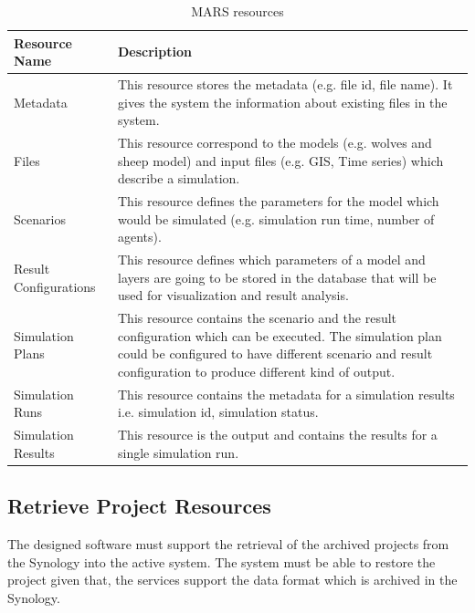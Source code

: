         \begin{table}[H]
            \centering
            \begin{tabular}{|p{3cm}|p{12cm}|}
                \hline
                    \textbf{Resource Name}  & \textbf{Description}\\
                \hline
                     Metadata & 
                     This resource stores the metadata (e.g. file id, file name). It gives the system the information about
                     existing files in the system. \\
                \hline
                     Files & 
                     This resource correspond to the models (e.g. wolves and sheep model) and input files (e.g. GIS, Time series) which describe a simulation. \\
                \hline
                     Scenarios & 
                     This resource defines the parameters for the model which would be simulated (e.g. simulation run time, number of agents). \\
                \hline
                     Result Configurations & 
                     This resource defines which parameters of a model and layers are going to be stored in the database that will be used for visualization
                     and result analysis.\\
                \hline
                     Simulation Plans & 
                     This resource contains the scenario and the result configuration which can be executed. The simulation plan could be configured to
                     have different scenario and result configuration to produce different kind of output.\\
                \hline
                     Simulation Runs & 
                     This resource contains the metadata for a simulation results i.e. simulation id, simulation status.\\
                \hline
                     Simulation Results & 
                     This resource is the output and contains the results for a single simulation run.\\
                \hline
            \end{tabular}
            \caption{MARS resources}
            \label{table: archivedMars}     
        \end{table} 
        
        
        
        \subsection{Retrieve Project Resources}    
            \label{ssec:retrieveAnalysis}
            The designed software must support the retrieval of the archived projects from the Synology into the active system. The
            system must be able to restore the project given that, the services support the data format which is archived in the Synology.
           
